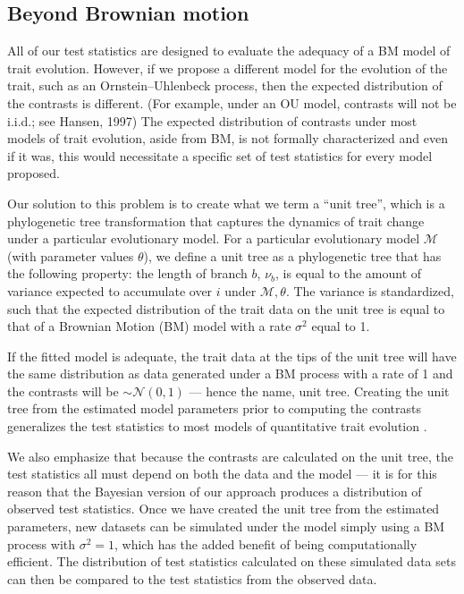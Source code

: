 \documentclass[a4paper,11pt]{article}
\begin{document}
\subsection*{Beyond Brownian motion}

All of our test statistics are designed to evaluate the adequacy of a BM model of trait evolution. However, if we propose a different model for the evolution of the trait, such as an Ornstein--Uhlenbeck \citep[OU;][]{Hansen1997} process, then the expected distribution of the contrasts is different. (For example, under an OU model, contrasts will not be i.i.d.; see Hansen, 1997) The expected distribution of contrasts under most models of trait evolution, aside from BM, is not formally characterized and even if it was, this would necessitate a specific set of test statistics for every model proposed.

Our solution to this problem is to create what we term a ``unit tree'', which is a phylogenetic tree transformation that captures the dynamics of trait change under a particular evolutionary model. For a particular evolutionary model $\mathcal{M}$ (with parameter values $\theta$), we define a unit tree as a phylogenetic tree that has the following property: the length of branch $b$, $\nu_b$, is equal to the amount of variance expected to accumulate over $i$ under $\mathcal{M}, \theta$. The variance is standardized, such that the expected distribution of the trait data on the unit tree is equal to that of a Brownian Motion (BM) model with a rate $\sigma^2$ equal to 1.

If the fitted model is adequate, the trait data at the tips of the unit tree will have the same distribution as data generated under a BM process with a rate of 1 and the contrasts will be $\sim \mathcal{N}(0,1)$ --- hence the name, unit tree. Creating the unit tree from the estimated model parameters prior to computing the contrasts generalizes the test statistics to most models of quantitative trait evolution \citep[but see][for an exception]{Landis2012, Landispreprint}. 

We also emphasize that because the contrasts are calculated on the unit tree, the test statistics all must depend on both the data and the model --- it is for this reason that the Bayesian version of our approach produces a distribution of observed test statistics. Once we have created the unit tree from the estimated parameters, new datasets can be simulated under the model simply using a BM process with $\sigma^2 = 1$, which has the added benefit of being computationally efficient.  
The distribution of test statistics calculated on these simulated data sets can then be compared to the test statistics from the observed data. 
\end{document}
